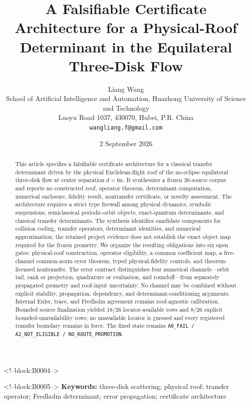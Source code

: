 \documentclass[11pt,a4paper]{article}
\title{A Falsifiable Certificate Architecture for a Physical-Roof Determinant in the Equilateral Three-Disk Flow}
\author{Liang Wang\\
\small School of Artificial Intelligence and Automation, Huazhong University of Science and Technology\\
\small Luoyu Road 1037, 430070, Hubei, P.R. China\\
\small \texttt{wangliang.f@gmail.com}}
\date{2 September 2026}
\begin{document}
\maketitle

<!--block:B0004-->
\begin{abstract}
This article specifies a falsifiable certificate architecture for a classical transfer determinant driven by the physical Euclidean-flight roof of the no-eclipse equilateral three-disk flow at center separation \(d=6a\). It synthesizes a frozen 26-source corpus and reports no constructed roof, operator theorem, determinant computation, numerical enclosure, fidelity result, nontransfer certificate, or novelty assessment. The architecture requires a strict type firewall among physical dynamics, symbolic suspensions, semiclassical periodic-orbit objects, exact-quantum determinants, and classical transfer determinants. The synthesis identifies candidate components for collision coding, transfer operators, determinant identities, and numerical approximation; the retained project evidence does not establish the exact object map required for the frozen geometry. We organize the resulting obligations into six open gates: physical-roof construction, operator eligibility, a common coefficient map, a five-channel common-norm error theorem, typed physical-fidelity controls, and theorem-licensed nontransfer. The error contract distinguishes four numerical channels---orbit tail, rank or projection, quadrature or evaluation, and roundoff---from separately propagated geometry and roof-input uncertainty. No channel may be combined without explicit stability, propagation, dependency, and determinant-conditioning arguments. Internal Euler, trace, and Fredholm agreement remains roof-agnostic calibration. Bounded source finalization yielded 18/26 locator-available rows and 8/26 explicit bounded-unavailability rows; no unavailable locator is guessed and every registered transfer boundary remains in force. The fixed state remains \texttt{A0\_FAIL / A2\_NOT\_ELIGIBLE / NO\_ROUTE\_PROMOTION}.
\end{abstract}

<!--block:B0005-->
\noindent\textbf{Keywords:} three-disk scattering; physical roof; transfer operator; Fredholm determinant; error propagation; certificate architecture
\end{document}
